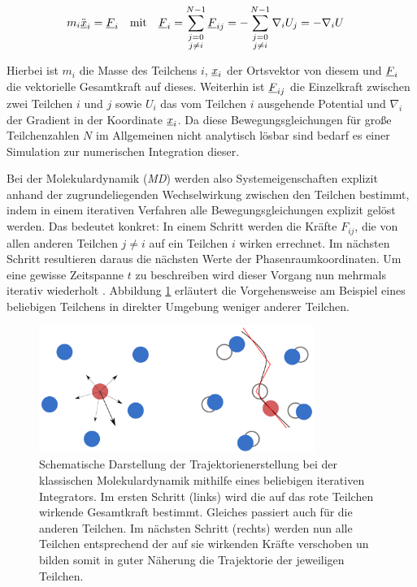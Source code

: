 		\begin{align}
			m_i \ddot{\underline{x}}_i &= \underline{F}_i
			& \text{mit} &&
			\underline{F}_{i} &= \sum_{\substack{j=0\\j \neq i}}^{N-1} \underline{F}_{ij}
			= -\sum_{\substack{j=0\\j \neq i}}^{N-1} \nabla_i U_j = -\nabla_i U
			\label{eq:newtone_dgl}
		\end{align}

		Hierbei ist $m_i$ die Masse des Teilchens $i$, $\underline{x}_i$ der Ortsvektor von diesem und
		$\underline{F}_{i}$ die vektorielle Gesamtkraft auf dieses. Weiterhin ist $\underline{F}_{ij}$ die
		Einzelkraft zwischen zwei Teilchen $i$ und $j$ sowie $U_i$ das vom Teilchen $i$ ausgehende
		Potential und $\nabla_i$ der Gradient in der Koordinate $\underline{x}_i$. Da diese
		Bewegungsgleichungen für große Teilchenzahlen $N$ im Allgemeinen nicht analytisch lösbar
		sind  bedarf es einer
		Simulation zur numerischen Integration dieser.

		Bei der Molekulardynamik (\emph{MD}) werden also Systemeigenschaften explizit anhand der
		zugrundeliegenden Wechselwirkung zwischen den Teilchen bestimmt, indem in einem
		iterativen Verfahren alle Bewegungsgleichungen explizit gelöst werden. Das bedeutet
		konkret: In einem Schritt werden die Kräfte $F_{ij}$, die von allen anderen Teilchen
		$j \neq i$ auf ein Teilchen $i$ wirken errechnet. Im nächsten Schritt resultieren daraus
		die nächsten Werte der Phasenraumkoordinaten. Um eine gewisse Zeitspanne $t$ zu
		beschreiben wird dieser Vorgang nun mehrmals iterativ wiederholt
		\cite{allen2004introduction}. Abbildung \ref{fig:scheme_md} erläutert die Vorgehensweise
		am Beispiel eines beliebigen Teilchens in direkter Umgebung weniger anderer Teilchen.

		\begin{figure}[!ht]
			\centering
			\includegraphics[width=0.8\textwidth]{chapter/main/img/scheme_md.png}
			\caption{Schematische Darstellung der Trajektorienerstellung bei der klassischen
			Molekulardynamik mithilfe eines beliebigen iterativen Integrators. Im ersten Schritt
			(links) wird die auf das rote Teilchen wirkende Gesamtkraft bestimmt. Gleiches
			passiert auch für die anderen Teilchen. Im nächsten Schritt (rechts) werden nun alle
			Teilchen entsprechend der auf sie wirkenden Kräfte verschoben un bilden somit in guter
			Näherung die Trajektorie der jeweiligen Teilchen. \cite{sonntag2011computer}}
			\label{fig:scheme_md}
		\end{figure}

